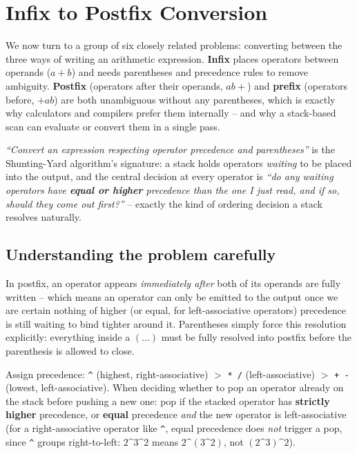 \section{Infix to Postfix Conversion}
\label{sec:sq-infix-to-postfix}

\noindent We now turn to a group of six closely related problems:
converting between the three ways of writing an arithmetic expression.
\textbf{Infix} places operators between operands ($a+b$) and needs
parentheses and precedence rules to remove ambiguity. \textbf{Postfix}
(operators after their operands, $ab+$) and \textbf{prefix} (operators
before, $+ab$) are both unambiguous without any parentheses, which is
exactly why calculators and compilers prefer them internally -- and why a
stack-based scan can evaluate or convert them in a single pass.


\begin{patternbox}
\emph{``Convert an expression respecting operator precedence and
parentheses''} is the Shunting-Yard algorithm's signature: a stack holds
operators \emph{waiting} to be placed into the output, and the central
decision at every operator is \emph{``do any waiting operators have
\textbf{equal or higher} precedence than the one I just read, and if so,
should they come out first?''} -- exactly the kind of ordering decision a
stack resolves naturally.
\end{patternbox}

\subsection*{Understanding the problem carefully}

In postfix, an operator appears \emph{immediately after} both of its
operands are fully written -- which means an operator can only be emitted
to the output once we are certain nothing of higher (or equal, for
left-associative operators) precedence is still waiting to bind tighter
around it. Parentheses simply force this resolution explicitly: everything
inside a $(\ldots)$ must be fully resolved into postfix before the
parenthesis is allowed to close.

\begin{ideabox}
Assign precedence: \texttt{\textasciicircum} (highest, right-associative)
$>$ \texttt{* /} (left-associative) $>$ \texttt{+ -} (lowest,
left-associative). When deciding whether to pop an operator already on
the stack before pushing a new one: pop if the stacked operator has
\textbf{strictly higher} precedence, or \textbf{equal} precedence \emph{and}
the new operator is left-associative (for a right-associative operator
like \texttt{\textasciicircum}, equal precedence does \emph{not} trigger a
pop, since \texttt{\textasciicircum} groups right-to-left:
$2\texttt{\textasciicircum}3\texttt{\textasciicircum}2$ means
$2\texttt{\textasciicircum}(3\texttt{\textasciicircum}2)$, not
$(2\texttt{\textasciicircum}3)\texttt{\textasciicircum}2$).
\end{ideabox}

